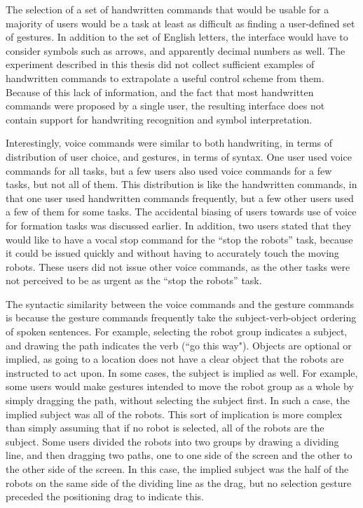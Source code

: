 The selection of a set of handwritten commands that would be usable for a majority of users would be a task at least as difficult as finding a user-defined set of gestures.
In addition to the set of English letters, the interface would have to consider symbols such as arrows, and apparently decimal numbers as well. 
The experiment described in this thesis did not collect sufficient examples of handwritten commands to extrapolate a useful control scheme from them.
Because of this lack of information, and the fact that most handwritten commands were proposed by a single user, the resulting interface does not contain support for handwriting recognition and symbol interpretation.  

Interestingly, voice commands were similar to both handwriting, in terms of distribution of user choice, and gestures, in terms of syntax. 
One user used voice commands for all tasks, but a few  users also used voice commands for a few tasks, but not all of them. 
This distribution is like the handwritten commands, in that one user used handwritten commands frequently, but a few other users used a few of them for some tasks.
The accidental biasing of users towards use of voice for formation tasks was discussed earlier. 
In addition, two users stated that they would like to have a vocal stop command for the ``stop the robots'' task, because it could be issued quickly and without having to accurately touch the moving robots. 
These users did not issue other voice commands, as the other tasks were not perceived to be as urgent as the ``stop the robots'' task. 

The syntactic similarity between the voice commands and the gesture commands is because the gesture commands frequently take the subject-verb-object ordering of spoken sentences. 
For example, selecting the robot group indicates a subject, and drawing the path indicates the verb (``go this way"). 
Objects are optional or implied, as going to a location does not have a clear object that the robots are instructed to act upon. 
In some cases, the subject is implied as well.
For example, some users would make gestures intended to move the robot group as a whole by simply dragging the path, without selecting the subject first. 
In such a case, the implied subject was all of the robots. 
This sort of implication is more complex than simply assuming that if no robot is selected, all of the robots are the subject. 
Some users divided the robots into two groups by drawing a dividing line, and then dragging two paths, one to one side of the screen and the other to the other side of the screen. 
In this case, the implied subject was the half of the robots on the same side of the dividing line as the drag, but no selection gesture preceded the positioning drag to indicate this. 

